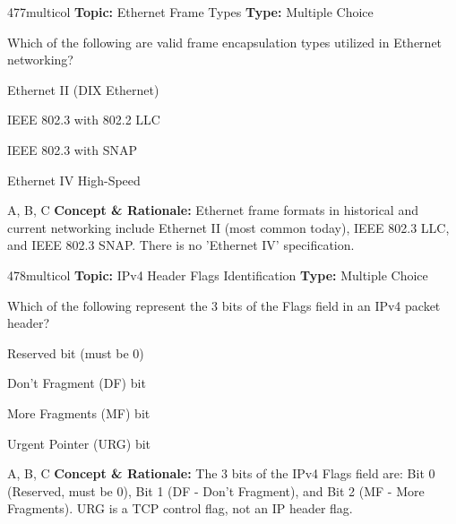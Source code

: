 \begin{qcard}{477}{multicol}
\textcolor{darkslate!75}{\small\textbf{Topic:} Ethernet Frame Types \hfill \textbf{Type:} Multiple Choice}\vspace{0.4em}\par
Which of the following are valid frame encapsulation types utilized in Ethernet networking?
\begin{qoptions}
\item Ethernet II (DIX Ethernet)
\item IEEE 802.3 with 802.2 LLC
\item IEEE 802.3 with SNAP
\item Ethernet IV High-Speed
\end{qoptions}
\end{qcard}
\nopagebreak
\begin{explainbox}{A, B, C}
\textbf{Concept \& Rationale:} Ethernet frame formats in historical and current networking include Ethernet II (most common today), IEEE 802.3 LLC, and IEEE 802.3 SNAP. There is no 'Ethernet IV' specification.
\end{explainbox}

\begin{qcard}{478}{multicol}
\textcolor{darkslate!75}{\small\textbf{Topic:} IPv4 Header Flags Identification \hfill \textbf{Type:} Multiple Choice}\vspace{0.4em}\par
Which of the following represent the 3 bits of the Flags field in an IPv4 packet header?
\begin{qoptions}
\item Reserved bit (must be 0)
\item Don't Fragment (DF) bit
\item More Fragments (MF) bit
\item Urgent Pointer (URG) bit
\end{qoptions}
\end{qcard}
\nopagebreak
\begin{explainbox}{A, B, C}
\textbf{Concept \& Rationale:} The 3 bits of the IPv4 Flags field are: Bit 0 (Reserved, must be 0), Bit 1 (DF - Don't Fragment), and Bit 2 (MF - More Fragments). URG is a TCP control flag, not an IP header flag.
\end{explainbox}

